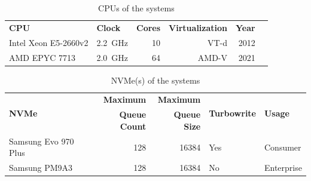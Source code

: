\begin{table}[H]
  \centering
  \begin{tabular}{llrrrr}
    \multirow{2}{*}{\textbf{CPU}} & \multirow{2}{*}{\textbf{Clock}} & \multirow{2}{*}{\textbf{Cores}} & \multirow{2}{*}{\textbf{Virtualization}} & \multirow{2}{*}{\textbf{Year}}
    \\
                                  &                                 &                                 &                                          &                                \\
    \toprule

    Intel Xeon E5-2660v2          & \qty{2.2}{\giga\Hz}             & 10                              & VT-d                                     & 2012                           \\
    AMD EPYC 7713                 & \qty{2.0}{\giga\Hz}             & 64                              & AMD-V                                    & 2021                           \\

    \bottomrule
  \end{tabular}

  \caption{CPUs of the systems}
  \label{tab:cpus}
\end{table}

\begin{table}[H]
  \centering
  \begin{tabular}{lrrll}
    \multirow{2}{*}{\textbf{NVMe}} & \textbf{Maximum}     & \textbf{Maximum}    & \multirow{2}{*}{\textbf{Turbowrite}} & \multirow{2}{*}{\textbf{Usage}} \\
                                   & \textbf{Queue Count} & \textbf{Queue Size} &                                      &                                 \\
    \toprule

    Samsung Evo 970 Plus           & 128                  & 16384               & Yes                                  & Consumer                        \\
    Samsung PM9A3                  & 128                  & 16384               & No                                   & Enterprise                      \\

    \bottomrule
  \end{tabular}

  \caption{NVMe(s) of the systems}
  \label{tab:nvmes}
\end{table}

